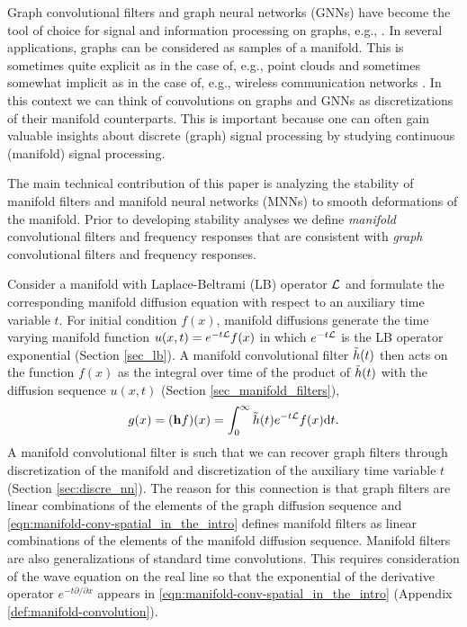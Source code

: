 
Graph convolutional filters\cite{ortega2018graph, isufi2016autoregressive, gama2020graphs} and graph neural networks (GNNs) \cite{scarselli2008graph, gama2019convolutional, zhou2020graph} have become the tool of choice for signal and information processing on graphs, e.g., \cite{fan2019graph, wu2019session, chowdhury2021unfolding, wang2020unsupervised}. In several applications, graphs can be considered as samples of a manifold. This is sometimes quite explicit as in the case of, e.g., point clouds \cite{bronstein2017geometric, bronstein2021geometric} and sometimes somewhat implicit as in the case of, e.g., wireless communication networks \cite{fan2019graph, wu2019session}. In this context we can think of convolutions on graphs and GNNs as discretizations of their manifold counterparts. This is important because one can often gain valuable insights about discrete (graph) signal processing by studying continuous (manifold) signal processing. 

The main technical contribution of this paper is analyzing the stability of manifold filters and manifold neural networks (MNNs) to smooth deformations of the manifold. Prior to developing stability analyses we define \emph{manifold} convolutional filters and frequency responses that are consistent with \emph{graph} convolutional filters and frequency responses. 

 Consider a manifold with Laplace-Beltrami (LB) operator ${\mathcal L}$ and formulate the corresponding manifold diffusion equation with respect to an auxiliary time variable $t$. For initial condition $f(x)$, manifold diffusions generate the time varying manifold function $u(x,t) = e^{-t{\mathcal L}}f(x)$ in which $e^{-t{\mathcal L}}$ is the LB operator exponential (Section \ref{sec_lb}). A manifold convolutional filter ${\tilde h}(t)$ then acts on the function $f(x)$ as the integral over time of the product of ${\tilde h}(t)$ with the diffusion sequence $u(x,t)$ (Section \ref{sec_manifold_filters}),
%
\begin{equation} \label{eqn:manifold-conv-spatial_in_the_intro}
   g(x) = ({\mathbf h} f)(x) =\int_0^\infty {\ensuremath{\tilde h}}(t)e^{-t{\mathcal L}}f(x)\text{d}t  .
\end{equation}
%
A manifold convolutional filter is such that we can recover graph filters through discretization of the manifold and discretization of the auxiliary time variable $t$ (Section \ref{sec:discre_nn}). The reason for this connection is that graph filters are linear combinations of the elements of the graph diffusion sequence \cite{shuman2013emerging, ortega2018graph, sandryhaila2013discrete} and \eqref{eqn:manifold-conv-spatial_in_the_intro} defines manifold filters as linear combinations of the elements of the manifold diffusion sequence. Manifold filters are also generalizations of standard time convolutions. This requires consideration of the wave equation on the real line so that the exponential of the derivative operator $e^{-t\partial/\partial x}$ appears in \eqref{eqn:manifold-conv-spatial_in_the_intro} (Appendix \ref{def:manifold-convolution}).



